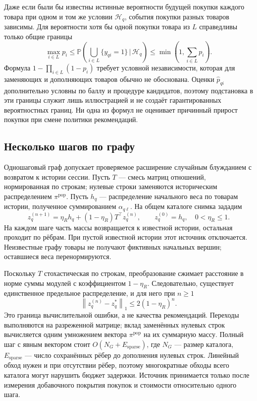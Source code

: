 \documentclass[12pt,a4paper]{article}
\newcommand{\Prob}{\mathbb P}
\newcommand{\norm}[1]{\left\lVert#1\right\rVert}
\newcommand{\given}{\,\vert\,}
\theoremstyle{plainru}
\begin{document}
Даже если были бы известны истинные вероятности будущей покупки
каждого товара при одном и том же условии $\mathcal H_q$, события
покупки разных товаров зависимы. Для вероятности хотя бы одной
покупки товара из $L$ справедливы только общие границы
\begin{equation}\label{eq:model-union-bounds}
\max_{i\in L}p_i\le
\Prob\!\left(\bigcup_{i\in L}\{y_{qi}=1\}\given\mathcal H_q\right)
\le\min\!\left(1,\sum_{i\in L}p_i\right).
\end{equation}
Формула $1-\prod_{i\in L}(1-p_i)$ требует условной независимости,
которая для заменяющих и дополняющих товаров обычно не обоснована.
Оценки $\widehat p_{qi}$ дополнительно условны по баллу и процедуре
кандидатов, поэтому подстановка в эти границы служит лишь
иллюстрацией и не создаёт гарантированных вероятностных границ.
Ни одна из формул не оценивает причинный прирост покупки
при смене политики рекомендаций.

\subsection{Несколько шагов по графу}

Одношаговый граф допускает проверяемое расширение случайным
блужданием с возвратом к истории сессии.
Пусть $T$ --- смесь матриц отношений, нормированная по строкам;
нулевые строки заменяются историческим распределением $\pi^{\mathrm{pop}}$.
Пусть $h_q$ --- распределение начального веса по товарам
истории, полученное суммированием $\alpha_{q\ell}$.
На общем каталоге снимка зададим
\begin{equation}\label{eq:model-ppr}
z_q^{(n+1)}=\eta_Rh_q+(1-\eta_R)T^\top z_q^{(n)},
\qquad z_q^{(0)}=h_q,\quad 0<\eta_R\le1.
\end{equation}
На каждом шаге часть массы возвращается к известной истории,
остальная проходит по рёбрам. При пустой известной истории
этот источник отключается. Неизвестные графу товары не получают
фиктивных начальных вершин; оставшиеся веса перенормируются.

Поскольку $T$ стохастическая по строкам, преобразование сжимает
расстояние в норме суммы модулей с коэффициентом $1-\eta_R$.
Следовательно, существует единственное предельное распределение,
и для него при $n\ge1$
\begin{equation}\label{eq:model-ppr-error}
\norm{z_q^{(n)}-z_q^*}_1\le2(1-\eta_R)^n.
\end{equation}
Это граница вычислительной ошибки, а не качества рекомендаций.
Переходы выполняются на разреженной матрице;
вклад заменённых нулевых строк вычисляется одним умножением
вектора $\pi^{\mathrm{pop}}$ на их суммарную массу.
Полный шаг с явным вектором стоит $O(N_G+E_{\mathrm{sparse}})$,
где $N_G$ --- размер каталога, $E_{\mathrm{sparse}}$ --- число сохранённых
рёбер до дополнения нулевых строк. Линейный обход нужен и при отсутствии рёбер,
поэтому многократные обходы всего каталога могут нарушить бюджет
задержки. Источник принимается только после измерения добавочного
покрытия покупок и стоимости относительно одного шага.
\end{document}
